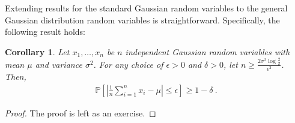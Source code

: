 \documentclass[11pt]{article}
\newtheorem{corollary}{Corollary}
\newcommand{\prob}[1]{\mathbb{P}\left[ #1 \right]}
\newcommand{\abs}[1]{\left| #1 \right|}
\begin{document}
Extending results for the standard Gaussian random variables to the general Gaussian distribution random variables is straightforward. Specifically, the following result holds:
\begin{corollary}
    \label{cor: general gaussian two-sided}
     Let $x_1,\ldots,x_n$ be $n$ independent Gaussian random variables with mean $\mu$ and variance $\sigma^2$. For any choice of $\epsilon > 0$ and $\delta > 0$, let $n \geq \frac{2 \sigma^2 \log \frac{2}{\delta}}{\epsilon^2}$. Then,
    \begin{align}
        \prob{\abs{\frac{1}{n} \sum_{i=1}^n x_i - \mu } \leq \epsilon} \geq 1 -  \delta~.
    \end{align}
\end{corollary}
\begin{proof}
    The proof is left as an exercise.
\end{proof}
\end{document}
